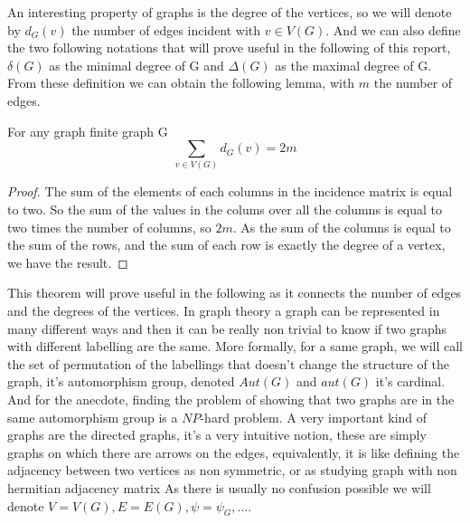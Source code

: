 \newline
An interesting property of graphs is the degree of the vertices, so we will denote by $d_G(v)$ the number of edges incident with $v \in V(G)$. And we can also define the two following notations that will prove useful in the following of this report, $\delta(G)$ as the minimal degree of G and $\Delta(G)$ as the maximal degree of G.
From these definition we can obtain the following lemma, with $m$ the number of edges.
\begin{theorem}
For any graph finite graph G
\begin{equation}
    \sum_{v\in V(G)} d_G(v) = 2m
\end{equation}
\end{theorem}
\begin{proof}
The sum of the elements of each columns in the incidence matrix is equal to two. So the sum of the values in the colums over all the columns is equal to two times the number of columns, so $2m$. As the sum of the columns is equal to the sum of the rows, and the sum of each row is exactly the degree of a vertex, we have the result.  
\end{proof}
This theorem will prove useful in the following as it connects the number of edges and the degrees of the vertices. In graph theory a graph can be represented in many different ways and then it can be really non trivial to know if two graphs with different labelling are the same. More formally, for a same graph, we will call the set of permutation of the labellings that doesn't change the structure of the graph, it's automorphism group, denoted $Aut(G)$ and $aut(G)$ it's cardinal. And for the anecdote, finding the problem of showing that two graphs are in the same automorphism group is a $NP$-hard problem.
\newline
A very important kind of graphs are the directed graphs, it's a very intuitive notion, these are simply graphs on which there are arrows on the edges, equivalently, it is like defining the adjacency between two vertices as non  symmetric, or as studying graph with non hermitian adjacency matrix 
\newline
As there is usually no confusion possible we will denote $V = V(G), E =E(G), \psi = \psi_G, ...$. 


